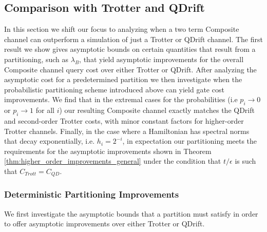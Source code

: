 \subsection{Comparison with Trotter and QDrift}

In this section we shift our focus to analyzing when a two term Composite channel can outperform a simulation of just a Trotter or QDrift channel. 
The first result we show gives asymptotic bounds on certain quantities that result from a partitioning, such as $\lambda_B$, that yield asymptotic
improvements for the overall Composite channel query cost over either Trotter or QDrift. After analyzing the asymptotic cost for a 
predetermined partition we then investigate when the probabilistic partitioning scheme introduced above can yield gate cost improvements. We find that
in the extremal cases for the probabilities (i.e $p_i \to 0$ or $p_i \to 1$ for all $i$)
our resulting Composite channel exactly matches the QDrift and second-order Trotter costs, with minor constant factors for higher-order Trotter
channels. Finally, in the case where a Hamiltonian has spectral norms that decay exponentially, i.e. $h_i = 2^{-i}$, in expectation our partitioning
meets the requirements for the asymptotic improvements shown in Theorem \ref*{thm:higher_order_improvements_general} under the condition that
$t/\epsilon$ is such that $C_{Trott} = C_{QD}$. 

\subsubsection{Deterministic Partitioning Improvements} \label{sec:higher_order_improvements}

We first investigate the asymptotic bounds that a partition must satisfy in order to offer asymptotic improvements over either Trotter or QDrift. 

\assImprovements*

